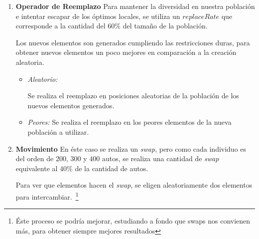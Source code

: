 \begin{enumerate}
\begin{itemize}
		\end{itemize}
	\item \textbf{Operador de Reemplazo}
		Para mantener la diversidad en nuestra población e intentar escapar de los óptimos locales,
		se utiliza un $replaceRate$ que corresponde a la cantidad del $60\%$ del tamaño de la población.

		Los nuevos elementos son generados cumpliendo las restricciones duras, para obtener nuevos
		elementos un poco mejores en comparación a la creación aleatoria.
		\begin{itemize}
			\item \emph{Aleatorio:}
 
				Se realiza el reemplazo en posiciones aleatorias de la población de los nuevos elementos
				generados.

			\item \emph{Peores:}
				Se realiza el reemplazo en los peores elementos de la nueva población a utilizar.

		\end{itemize}
	\item \textbf{Movimiento}
		En éste caso se realiza un \emph{swap}, pero como cada individuo es del orden de $200$, $300$ y $400$ autos,
		se realiza una cantidad de \emph{swap} equivalente al $40\%$ de la cantidad de autos.
	
		Para ver que elementos hacen el \emph{swap}, se eligen aleatoriamente dos elementos para intercambiar.~\footnote{
		Éste proceso se podría mejorar, estudiando a fondo que swaps nos convienen más, para obtener siempre mejores
		resultados}
\end{enumerate}



